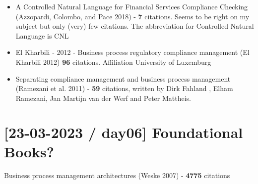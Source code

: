 \documentclass[
  letterpaper,
  DIV=11,
  numbers=noendperiod]{scrreprt}
\begin{document}
\begin{itemize}
\item
  A Controlled Natural Language for Financial Services Compliance
  Checking (Azzopardi, Colombo, and Pace 2018) - \textbf{7} citations.
  Seems to be right on my subject but only (very) few citations. The
  abbreviation for Controlled Natural Language is CNL
\item
  El Kharbili - 2012 - Business
  process regulatory compliance management (El Kharbili 2012)
  \textbf{96} citations. Affiliation University of Luxemburg
\item
  Separating compliance management and business process management
  (Ramezani et al. 2011) - \textbf{59} citations, written by Dirk
  Fahland
  ,
  Elham Ramezani, Jan Martijn van der
  Werf
  and Peter Mattheis.
\end{itemize}

\hypertarget{day06-foundational-books}{%
\section{{[}23-03-2023 / day06{]} Foundational
Books?}\label{day06-foundational-books}}

\begin{tcolorbox}[enhanced jigsaw, coltitle=black, arc=.35mm, breakable, opacityback=0, toptitle=1mm, left=2mm, colframe=quarto-callout-tip-color-frame, colbacktitle=quarto-callout-tip-color!10!white, bottomtitle=1mm, titlerule=0mm, title=\textcolor{quarto-callout-tip-color}{\faLightbulb}\hspace{0.5em}{\href{https://bpt.hpi.uni-potsdam.de/people/mathias-weske/}{Mathias
Weske, Universität Potsdam}}, rightrule=.15mm, bottomrule=.15mm, opacitybacktitle=0.6, toprule=.15mm, leftrule=.75mm, colback=white]


Business process management architectures (Weske 2007) - \textbf{4775}
citations

\end{tcolorbox}
\end{document}
